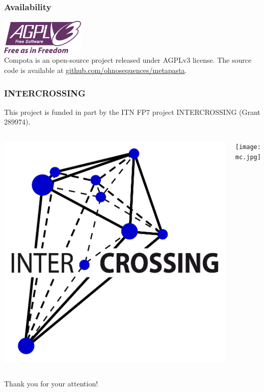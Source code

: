 \documentclass{beamer}
\begin{document}
 \begin{frame}
 \frametitle{Availability}

\hspace{.35\textwidth}\includegraphics[width=0.3\textwidth]{agpl.pdf}\hspace{.35\textwidth} \\
 \vspace{1em}
Compota is an open-source project released under AGPLv3 license.
The source code is available at \url{github.com/ohnosequences/metapasta}.

\end{frame}

 \begin{frame}
 \frametitle{INTERCROSSING}
 This project is funded in part by the ITN FP7 project INTERCROSSING (Grant 289974).
 \begin{columns}[T]
 		\begin{column}{.5\textwidth}
 			\hspace{.25\textwidth}\includegraphics[width=.5\textwidth]{intercrossing.png}
 		\end{column}
 		\begin{column}{.5\textwidth}
 			\hspace{.25\textwidth}\texttt{[image: mc.jpg]}
 		\end{column}
 	\end{columns}
 \end{frame}


\begin{frame}
\Huge{\centerline{Thank you for your attention!}}
\end{frame}
\end{document}
